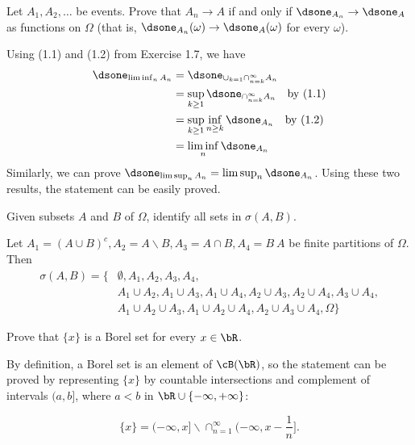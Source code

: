 \begin{exercise}
  Let $A_1,A_2,\ldots$ be events. Prove that $A_n\to A$ if and only if $\dsone_{A_n}\to \dsone_A$ as functions on $\Omega$ (that is, $\dsone_{A_n}(\omega)\to\dsone_A(\omega)$ for every $\omega$).
\end{exercise}
\begin{solution}
  Using (1.1) and (1.2) from Exercise 1.7, we have
  \begin{align*}
    \dsone_{\liminf_n A_n} &= \dsone_{ \cup_{k=1}\cap_{n=k}^\infty A_n } \\
      &= \sup_{k\geq 1}\dsone_{\cap_{n=k}^\infty A_n } \quad\text{by (1.1)} \\
      &= \sup_{k\geq 1}\inf_{n\geq k}\dsone_{A_n } \quad\text{by (1.2)} \\
      &= \liminf_n \dsone_{A_n}
  \end{align*}
  Similarly, we can prove $\dsone_{\limsup_n A_n} = \limsup_n \dsone_{A_n}$. Using these two results, the statement can be easily proved.
\end{solution}


\begin{exercise}
  Given subsets $A$ and $B$ of $\Omega$, identify all sets in $\sigma(A, B)$.
\end{exercise}
\begin{solution}
  Let $A_1=(A\cup B)^c, A_2=A\backslash B, A_3=A\cap B, A_4=B\ A$ be finite partitions of $\Omega$. Then
  \begin{align*}
  \sigma(A, B) = \{ & \emptyset, A_1, A_2, A_3, A_4, \\
    & A_1\cup A_2, A_1\cup A_3, A_1\cup A_4, A_2\cup A_3, A_2\cup A_4, A_3\cup A_4, \\
    & A_1\cup A_2\cup A_3, A_1\cup A_2\cup A_4, A_2\cup A_3\cup A_4, \Omega  \}
  \end{align*}
\end{solution}


\begin{exercise}
  Prove that $\{ x \} $ is a Borel set for every $x\in\bR$.
\end{exercise}
\begin{solution}
  By definition, a Borel set is an element of $\cB(\bR)$, so the statement can be proved by representing $\{ x \} $ by countable intersections and complement of intervals $(a, b]$, where $a<b$ in $\bR\cup \{ -\infty, +\infty \} $:

  \[ \{ x \}  = (-\infty, x] \backslash \cap_{n=1}^\infty (-\infty, x-\frac{1}{n}] .\]
\end{solution}
